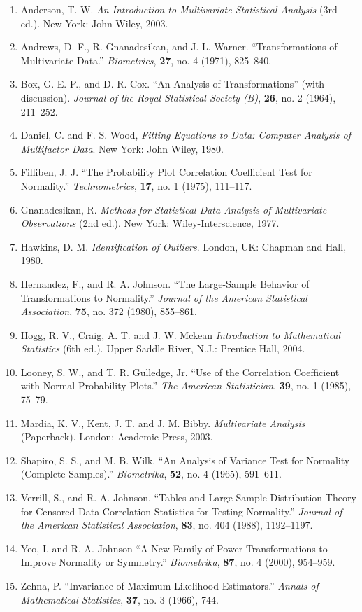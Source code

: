 \begin{enumerate}[leftmargin=2em,itemsep=2pt]
\item Anderson, T. W. \textit{An Introduction to Multivariate Statistical Analysis} (3rd ed.). New York: John Wiley, 2003.
\item Andrews, D. F., R. Gnanadesikan, and J. L. Warner. “Transformations of Multivariate Data.” \textit{Biometrics}, \textbf{27}, no. 4 (1971), 825--840.
\item Box, G. E. P., and D. R. Cox. “An Analysis of Transformations” (with discussion). \textit{Journal of the Royal Statistical Society (B)}, \textbf{26}, no. 2 (1964), 211--252.
\item Daniel, C. and F. S. Wood, \textit{Fitting Equations to Data: Computer Analysis of Multifactor Data}. New York: John Wiley, 1980.
\item Filliben, J. J. “The Probability Plot Correlation Coefficient Test for Normality.” \textit{Technometrics}, \textbf{17}, no. 1 (1975), 111--117.
\item Gnanadesikan, R. \textit{Methods for Statistical Data Analysis of Multivariate Observations} (2nd ed.). New York: Wiley-Interscience, 1977.
\item Hawkins, D. M. \textit{Identification of Outliers}. London, UK: Chapman and Hall, 1980.
\item Hernandez, F., and R. A. Johnson. “The Large-Sample Behavior of Transformations to Normality.” \textit{Journal of the American Statistical Association}, \textbf{75}, no. 372 (1980), 855--861.
\item Hogg, R. V., Craig, A. T. and J. W. Mckean \textit{Introduction to Mathematical Statistics} (6th ed.). Upper Saddle River, N.J.: Prentice Hall, 2004.
\item Looney, S. W., and T. R. Gulledge, Jr. “Use of the Correlation Coefficient with Normal Probability Plots.” \textit{The American Statistician}, \textbf{39}, no. 1 (1985), 75--79.
\item Mardia, K. V., Kent, J. T. and J. M. Bibby. \textit{Multivariate Analysis} (Paperback). London: Academic Press, 2003.
\item Shapiro, S. S., and M. B. Wilk. “An Analysis of Variance Test for Normality (Complete Samples).” \textit{Biometrika}, \textbf{52}, no. 4 (1965), 591--611.
\item Verrill, S., and R. A. Johnson. “Tables and Large-Sample Distribution Theory for Censored-Data Correlation Statistics for Testing Normality.” \textit{Journal of the American Statistical Association}, \textbf{83}, no. 404 (1988), 1192--1197.
\item Yeo, I. and R. A. Johnson “A New Family of Power Transformations to Improve Normality or Symmetry.” \textit{Biometrika}, \textbf{87}, no. 4 (2000), 954--959.
\item Zehna, P. “Invariance of Maximum Likelihood Estimators.” \textit{Annals of Mathematical Statistics}, \textbf{37}, no. 3 (1966), 744.
\end{enumerate}
